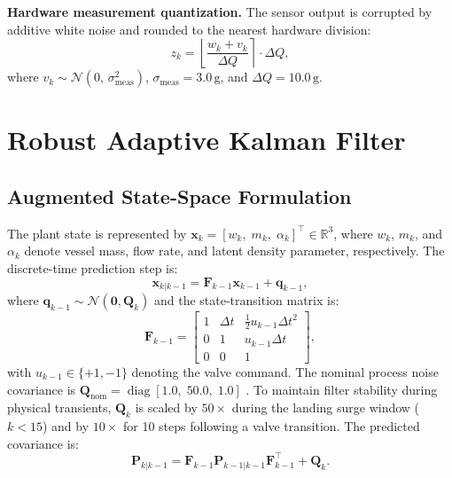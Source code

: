 \documentclass[conference]{IEEEtran}
\begin{document}
\textbf{Hardware measurement quantization.} The sensor 
output is corrupted by additive white noise and rounded to 
the nearest hardware division:
\begin{equation}
    z_k = \left\lfloor\frac{w_k + v_k}{\Delta Q}
    \right\rceil\cdot\Delta Q,
\end{equation}
where $v_k \sim \mathcal{N}(0,\,\sigma_\text{meas}^2)$, 
$\sigma_\text{meas} = 3.0\,\text{g}$, and 
$\Delta Q = 10.0\,\text{g}$.

\section{Robust Adaptive Kalman Filter}
\label{sec:kf}

\subsection{Augmented State-Space Formulation}

The plant state is represented by $\mathbf{x}_k = 
[w_k,\; m_k,\; \alpha_k]^\top \in \mathbb{R}^3$, where 
$w_k$, $m_k$, and $\alpha_k$ denote vessel mass, flow 
rate, and latent density parameter, respectively. The 
discrete-time prediction step is:
\begin{equation}
    \mathbf{x}_{k|k-1} = \mathbf{F}_{k-1}\mathbf{x}_{k-1} 
    + \mathbf{q}_{k-1},
\end{equation}
where $\mathbf{q}_{k-1} \sim \mathcal{N}(\mathbf{0}, 
\mathbf{Q}_k)$ and the state-transition matrix is:
\begin{equation}
    \mathbf{F}_{k-1} = \begin{bmatrix}
        1 & \Delta t & \tfrac{1}{2}u_{k-1}\Delta t^2 \\
        0 & 1        & u_{k-1}\Delta t \\
        0 & 0        & 1
    \end{bmatrix},
    \label{eq:state_transition}
\end{equation}
with $u_{k-1} \in \{+1,-1\}$ denoting the valve command. 
The nominal process noise covariance is 
$\mathbf{Q}_\text{nom} = \operatorname{diag}[1.0,\;50.0,
\;1.0]$ \cite{barshalom2001,simon2006}. To maintain filter 
stability during physical transients, $\mathbf{Q}_k$ is 
scaled by $50\times$ during the landing surge window 
($k < 15$) and by $10\times$ for 10 steps following a 
valve transition. The predicted covariance is:
\begin{equation}
    \mathbf{P}_{k|k-1} = \mathbf{F}_{k-1}
    \mathbf{P}_{k-1|k-1}\mathbf{F}_{k-1}^\top + 
    \mathbf{Q}_k.
\end{equation}
\end{document}
